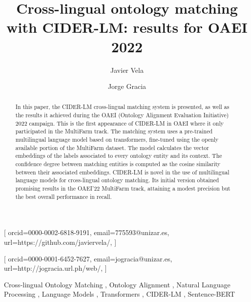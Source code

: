 \documentclass[
]{ceurart}
\begin{document}


\title{Cross-lingual ontology matching with CIDER-LM: results for OAEI 2022}

\author{Javier Vela}[%
orcid=0000-0002-6818-9191,
email=775593@unizar.es,
url=https://github.com/javiervela/,
]
\author{Jorge Gracia}[%
orcid=0000-0001-6452-7627,
email=jogracia@unizar.es,
url=http://jogracia.url.ph/web/,
]

\address{Department of Computer Science and Systems Engineering\\ University of Zaragoza \\
María de Luna 1, 50018 Zaragoza, Spain}

\begin{abstract}
In this paper, the CIDER-LM cross-lingual matching system is presented, as well as the results it achieved during the OAEI (Ontology Alignment Evaluation Initiative) 2022 campaign. This is the first appearance of CIDER-LM in OAEI where it only participated in the MultiFarm track. The matching system uses a pre-trained multilingual language model based on transformers, fine-tuned using the openly available portion of the MultiFarm dataset. The model calculates the vector embeddings of the labels associated to every ontology entity and its context. The confidence degree between matching entities is computed as the cosine similarity between their associated embeddings. CIDER-LM is novel in the use of multilingual language models for cross-lingual ontology matching. Its initial version obtained promising results in the OAEI'22 MultiFarm track, attaining a modest precision but the best overall performance in recall. 
\end{abstract}

\begin{keywords}
    Cross-lingual Ontology Matching \sep
    Ontology Alignment \sep
    Natural Language Processing \sep
    Language Models \sep
    Transformers \sep
    CIDER-LM \sep
    Sentence-BERT
\end{keywords}

\maketitle
\end{document}
